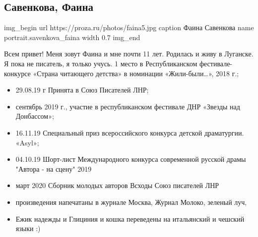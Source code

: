  
 
 

\subsection{Савенкова, Фаина}

\ifcmt
img_begin 
	url https://proza.ru/photos/faina5.jpg
	caption Фаина Савенкова
	name portrait.savenkova_faina
	width 0.7
img_end
\fi

Всем привет! Меня зовут Фаина и мне почти 11 лет. Родилась и живу в Луганске. Я
пока не писатель, я только учусь. 1 место в Республиканском фестивале-конкурсе
«Страна читающего детства» в номинации «Жили-были…», 2018 г.;

\begin{itemize}
  \item 29.08.19 г Принята в Союз Писателей ЛНР;
  \item сентябрь 2019 г., участие в республиканском фестивале ДНР «Звезды над Донбассом»;
  \item 16.11.19 Специальный приз всероссийского конкурса детской драматургии.  «Asyl»;
  \item 04.10.19 Шорт-лист Международного конкурса современной русской драмы "Автора - на сцену" 2019
  \item март 2020 Сборник молодых авторов Всходы Союз писателей ЛНР
  \item произведения напечатаны в журнале Москва, Журнал Молоко, зеленый луч,
  \item Ежик надежды и Глициния и кошка переведены на итальянский и чешский языки :)
\end{itemize}



